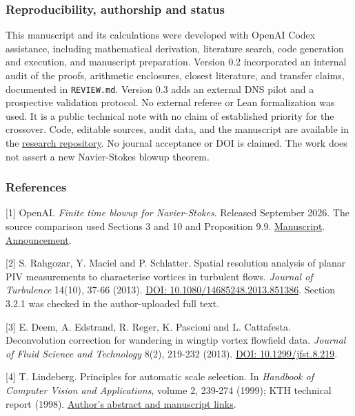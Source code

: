 \documentclass[
]{article}
\begin{document}
\hypertarget{reproducibility-authorship-and-status}{%
\subsubsection{Reproducibility, authorship and
status}\label{reproducibility-authorship-and-status}}

This manuscript and its calculations were developed with OpenAI Codex
assistance, including mathematical derivation, literature search, code
generation and execution, and manuscript preparation. Version 0.2
incorporated an internal audit of the proofs, arithmetic enclosures,
closest literature, and transfer claims, documented in
\texttt{REVIEW.md}. Version 0.3 adds an external DNS pilot and a
prospective validation protocol. No external referee or Lean
formalization was used. It is a public technical note with no claim of
established priority for the crossover. Code, editable sources, audit
data, and the manuscript are available in the
\href{https://github.com/Trenn1x/Trenn1x/tree/main/research/vortex-observability}{research
repository}. No journal acceptance or DOI is claimed. The work does not
assert a new Navier-Stokes blowup theorem.

\hypertarget{references}{%
\subsubsection{References}\label{references}}

{[}1{]} OpenAI. \emph{Finite time blowup for Navier-Stokes}. Released
September 2026. The source comparison used Sections 3 and 10 and
Proposition 9.9.
\href{https://cdn.openai.com/pdf/32d9f210-8b73-45e0-91bc-82a30aef8a9a/navier-stokes.pdf}{Manuscript}.
\href{https://openai.com/index/navier-stokes-solution/}{Announcement}.

{[}2{]} S. Rahgozar, Y. Maciel and P. Schlatter. Spatial resolution
analysis of planar PIV measurements to characterise vortices in
turbulent flows. \emph{Journal of Turbulence} 14(10), 37-66 (2013).
\href{https://doi.org/10.1080/14685248.2013.851386}{DOI:
10.1080/14685248.2013.851386}. Section 3.2.1 was checked in the
author-uploaded full text.

{[}3{]} E. Deem, A. Edstrand, R. Reger, K. Pascioni and L. Cattafesta.
Deconvolution correction for wandering in wingtip vortex flowfield data.
\emph{Journal of Fluid Science and Technology} 8(2), 219-232 (2013).
\href{https://doi.org/10.1299/jfst.8.219}{DOI: 10.1299/jfst.8.219}.

{[}4{]} T. Lindeberg. Principles for automatic scale selection. In
\emph{Handbook of Computer Vision and Applications}, volume 2, 239-274
(1999); KTH technical report (1998).
\href{https://www.csc.kth.se/cvap/abstracts/cvap222.html}{Author's
abstract and manuscript links}.
\end{document}
